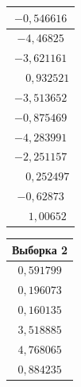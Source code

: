 \begin{table}[h]
\begin{minipage}[h]{0.49\linewidth}
\begin{center}
\begin{tabular}{|c|}
          $-0{,}546616$ \\
          \hline 
        
          $-4{,}46825$ \\
          \hline 
        
          $-3{,}621161$ \\
          \hline 
        
          $\phantom{-}0{,}932521$ \\
          \hline 
        
          $-3{,}513652$ \\
          \hline 
        
          $-0{,}875469$ \\
          \hline 
        
          $-4{,}283991$ \\
          \hline 
        
          $-2{,}251157$ \\
          \hline 
        
          $\phantom{-}0{,}252497$ \\
          \hline 
        
          $-0{,}62873$ \\
          \hline 
        
          $\phantom{-}1{,}00652$ \\
          \hline 
        
      \end{tabular}
      \hspace*{1em}
      \begin{tabular}{|c|}
        \hline
        Выборка 2 \\
        \hline 
        
          $0{,}591799$ \\
          \hline 
        
          $0{,}196073$ \\
          \hline 
        
          $0{,}160135$ \\
          \hline 
        
          $3{,}518885$ \\
          \hline 
        
          $4{,}768065$ \\
          \hline 
        
          $0{,}884235$ \\
          \hline 
        

\end{tabular}
\end{center}
\end{minipage}
\end{table}
